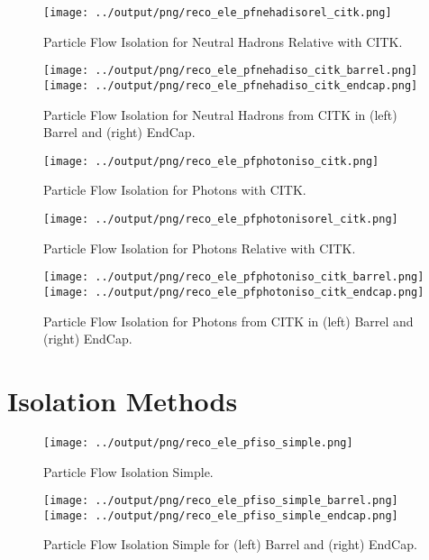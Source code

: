 \documentclass[11pt]{book}
\begin{document}
\begin{figure}[htb]
\centering
\texttt{[image: ../output/png/reco\_ele\_pfnehadisorel\_citk.png]}
\caption{Particle Flow Isolation for Neutral Hadrons Relative with CITK.}
\label{fig:reco_ele_pfnehadisorel_citk}
\end{figure}

\begin{figure}[ht]
\centering
\texttt{[image: ../output/png/reco\_ele\_pfnehadiso\_citk\_barrel.png]}
\texttt{[image: ../output/png/reco\_ele\_pfnehadiso\_citk\_endcap.png]}
\caption{Particle Flow Isolation for Neutral Hadrons from CITK in (left) Barrel and (right) EndCap.}
\label{fig:reco_ele_pfnehadiso_citk_regions}
\end{figure}

\begin{figure}[htb]
\centering
\texttt{[image: ../output/png/reco\_ele\_pfphotoniso\_citk.png]}
\caption{Particle Flow Isolation for Photons with CITK.}
\label{fig:reco_ele_pfphotoniso_citk}
\end{figure}

\begin{figure}[htb]
\centering
\texttt{[image: ../output/png/reco\_ele\_pfphotonisorel\_citk.png]}
\caption{Particle Flow Isolation for Photons Relative with CITK.}
\label{fig:reco_ele_pfphotonisorel_citk}
\end{figure}

\begin{figure}[ht]
\centering
\texttt{[image: ../output/png/reco\_ele\_pfphotoniso\_citk\_barrel.png]}
\texttt{[image: ../output/png/reco\_ele\_pfphotoniso\_citk\_endcap.png]}
\caption{Particle Flow Isolation for Photons from CITK in (left) Barrel and (right) EndCap.}
\label{fig:reco_ele_pfphotoniso_citk_regions}
\end{figure}

\clearpage


\section{Isolation Methods}
\begin{figure}[ht]
\centering
\texttt{[image: ../output/png/reco\_ele\_pfiso\_simple.png]}
\caption{Particle Flow Isolation Simple.}
\label{fig:reco_ele_pfiso_simple}
\end{figure}

\begin{figure}[ht]
\centering
\texttt{[image: ../output/png/reco\_ele\_pfiso\_simple\_barrel.png]}
\texttt{[image: ../output/png/reco\_ele\_pfiso\_simple\_endcap.png]}
\caption{Particle Flow Isolation Simple for (left) Barrel and (right) EndCap.}
\label{fig:reco_ele_pfiso_simple_regions}
\end{figure}
\end{document}
